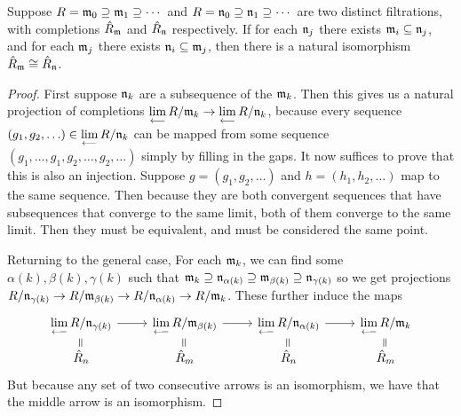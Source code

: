 \begin{lemma}\label{lem:isomorphism-completions}
    Suppose \(R = \mathfrak{m}_0 \supseteq \mathfrak{m}_1 \supseteq \cdots\)
    and \(R = \mathfrak{n}_0 \supseteq \mathfrak{n}_1 \supseteq \cdots\) are two distinct filtrations,
    with completions \(\hat{R}_{\mathfrak{m}}\) and \(\hat{R}_{\mathfrak{n}}\) respectively.
    If for each \(\mathfrak{n}_j\) there exists \(\mathfrak{m}_i \subseteq \mathfrak{n}_j\),
    and for each \(\mathfrak{m}_j\) there exists \(\mathfrak{n}_i \subseteq \mathfrak{m}_j\),
    then there is a natural isomorphism \(\hat{R}_{\mathfrak{m}} \cong \hat{R}_{\mathfrak{n}}\).
\end{lemma}
\begin{proof}
    First suppose \(\mathfrak{n}_k\) are a subsequence of the \(\mathfrak{m}_k\).
    Then this gives us a natural projection of completions \(\operatorname{\displaystyle\lim_{\longleftarrow}} R/\mathfrak{m}_k \to \operatorname{\displaystyle\lim_{\longleftarrow}} R/\mathfrak{n}_k\),
    because every sequence \((g_1,g_2,\hdots) \in \operatorname{\displaystyle\lim_{\longleftarrow}} R/\mathfrak{n}_k\)
    can be mapped from some sequence \((g_1,\hdots,g_1,g_2,\hdots,g_2,\hdots)\) simply by filling in the gaps.
    It now suffices to prove that this is also an injection.
    Suppose \(g = (g_1,g_2,\hdots)\) and \(h = (h_1,h_2,\hdots)\) map to the same sequence.
    Then because they are both convergent sequences that have subsequences that converge to the same limit,
    both of them converge to the same limit.
    Then they must be equivalent, and must be considered the same point.

    Returning to the general case,
    For each \(\mathfrak{m}_k\), we can find some \(\alpha(k),\beta(k),\gamma(k)\) such that
    \(\mathfrak{m}_k \supseteq \mathfrak{n}_{\alpha(k)} \supseteq \mathfrak{m}_{\beta(k)} \supseteq \mathfrak{n}_{\gamma(k)}\)
    so we get projections \(R/\mathfrak{n}_{\gamma(k)} \to R/\mathfrak{m}_{\beta(k)} \to R/\mathfrak{n}_{\alpha(k)} \to R/\mathfrak{m}_k\).
    These further induce the maps
    \begin{equation*}
        \begin{tikzcd}[row sep=tiny]
            \invlim R/\mfk{n}_{\gamma(k)} \arrow{r} & \invlim R/\mfk{m}_{\beta(k)} \arrow{r} & \invlim R/\mfk{n}_{\alpha(k)} \arrow{r} & \invlim R/\mfk{m}_k \\
            \hat{R}_n \arrow[phantom]{u}[sloped]{=} & \hat{R}_m \arrow[phantom]{u}[sloped]{=} & \hat{R}_n \arrow[phantom]{u}[sloped]{=} & \hat{R}_m \arrow[phantom]{u}[sloped]{=}
        \end{tikzcd}
    \end{equation*}
    But because any set of two consecutive arrows is an isomorphism,
    we have that the middle arrow is an isomorphism.
\end{proof}
